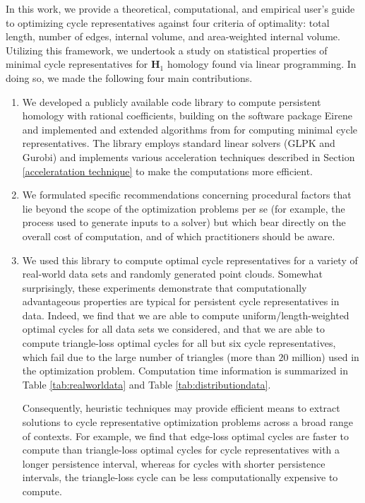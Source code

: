 \documentclass[11pt,onecolumn]{article}
\newcommand{\Homologies}[0]{\mathbf{H}}
\newcommand{\tab}{Table }
\newcommand{\se}{Section }
\theoremstyle{plain}
\theoremstyle{definition}
\begin{document}
In this work, we provide a theoretical, computational, and empirical user's guide to optimizing cycle representatives against four criteria of optimality: total length, number of edges, internal volume, and area-weighted internal volume. Utilizing this framework, we undertook a study on statistical properties of minimal cycle representatives for $\Homologies_1$ homology found via linear programming. In doing so, we made the following four main contributions.
\begin{enumerate}
    \item We developed a publicly available code library \cite{li_thompson} to compute persistent homology with rational coefficients, building on the software package Eirene \cite{eirene} and implemented and extended algorithms from \cite{Escolar2016, Obayashi2018}  for computing minimal cycle representatives. The library employs standard linear solvers (GLPK and Gurobi) and implements various acceleration techniques described in \se \ref{acceleratation technique} to make the computations more efficient. 
    \item We formulated specific recommendations concerning procedural factors that lie beyond the scope of the optimization problems per se (for example, the process used to generate inputs to a solver) but which bear directly on the overall cost of computation, and of which practitioners should be aware. 
    \item We used this library to compute optimal cycle representatives for a variety of real-world data sets and randomly generated point clouds.  Somewhat surprisingly, these experiments demonstrate that computationally advantageous properties are typical for persistent cycle representatives in data. Indeed, we find that we are able to compute uniform/length-weighted optimal cycles for all data sets we considered, and that we are able to compute triangle-loss optimal cycles for all but six cycle representatives, which fail due to the large number of triangles (more than $20$ million) used in the optimization problem. Computation time information is summarized in \tab \ref{tab:realworldata} and \tab \ref{tab:distributiondata}. 
    
    Consequently, heuristic techniques may provide efficient means to extract solutions to cycle representative optimization problems across a broad range of contexts. For example, we find that edge-loss optimal cycles are faster to compute than triangle-loss optimal cycles for cycle representatives with a longer persistence interval, whereas for cycles with shorter persistence intervals, the triangle-loss cycle can be less computationally expensive to compute.
    

\end{enumerate}
\end{document}
